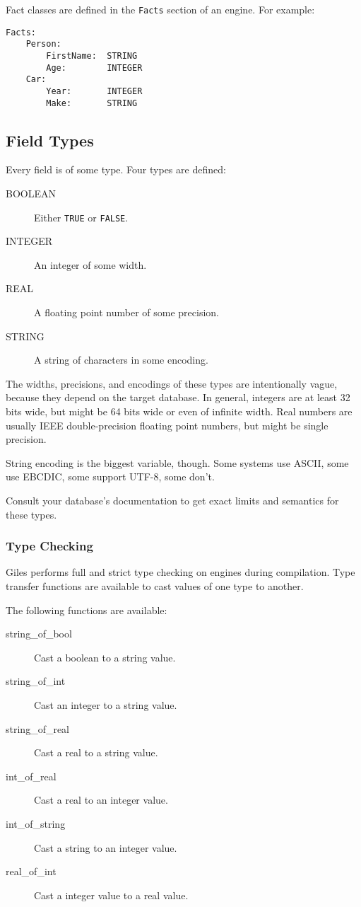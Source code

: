 \documentclass[letterpaper,10pt]{article}
\begin{document}
Fact classes are defined in the \texttt{Facts} section of an engine.
For example:
\begin{lstlisting}
Facts:
    Person:
        FirstName:  STRING
        Age:        INTEGER
    Car:
        Year:       INTEGER
        Make:       STRING
\end{lstlisting}

\subsection{Field Types}
Every field is of some type.
Four types are defined:
\begin{description}
    \item[BOOLEAN]  Either \texttt{TRUE} or \texttt{FALSE}.
    \item[INTEGER]  An integer of some width.
    \item[REAL]     A floating point number of some precision.
    \item[STRING]   A string of characters in some encoding.
\end{description}

The widths, precisions, and encodings of these types are intentionally vague, because they depend on the target database.
In general, integers are at least 32 bits wide, but might be 64 bits wide or even of infinite width.
Real numbers are usually IEEE double-precision floating point numbers, but might be single precision.

String encoding is the biggest variable, though.
Some systems use ASCII, some use EBCDIC, some support UTF-8, some don't.

Consult your database's documentation to get exact limits and semantics for these types.

\subsubsection{Type Checking}
Giles performs full and strict type checking on engines during compilation.
Type transfer functions are available to cast values of one type to another.

The following functions are available:
\begin{description}
    \item[string\_of\_bool]   Cast a boolean to a string value.
    \item[string\_of\_int]    Cast an integer to a string value.
    \item[string\_of\_real]   Cast a real to a string value.
    \item[int\_of\_real]      Cast a real to an integer value.
    \item[int\_of\_string]    Cast a string to an integer value.
    \item[real\_of\_int]      Cast a integer value to a real value.
\end{description}
\end{document}
